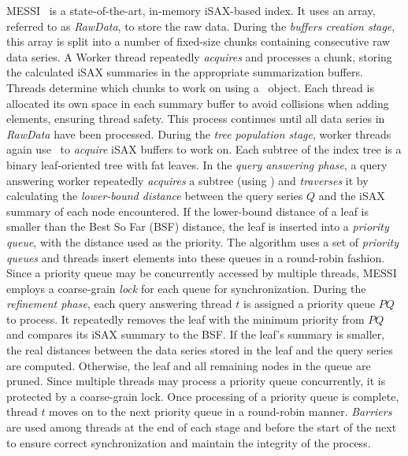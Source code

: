 MESSI~\cite{peng2020messi} is a state-of-the-art, in-memory iSAX-based index.
It uses an array, referred to as \textit{RawData}, to store the raw data. During the 
{\em buffers creation stage}, this array is split into a number of fixed-size chunks 
containing consecutive raw data series. A Worker thread repeatedly {\em acquires} and
processes a chunk, storing the calculated iSAX summaries in the appropriate 
summarization buffers. Threads determine which chunks to work on using a \FAI\ object.
Each thread is allocated its own space in each summary buffer to avoid collisions when
adding elements, ensuring thread safety. This process continues until all data series in
\textit{RawData} have been processed.
% 
During the {\em tree population stage}, worker threads again use \FAI\ to {\em acquire}
iSAX buffers to work on. Each subtree of the index tree is a binary leaf-oriented tree
with fat leaves.
% 
In the {\em query answering phase}, a query answering worker repeatedly {\em acquires}
a subtree (using \FAI) and {\em traverses} it by calculating the {\em lower-bound
distance} between the query series \( Q \) and the iSAX summary of each node
encountered. If the lower-bound distance of a leaf is smaller than the Best So Far (BSF)
distance, the leaf is inserted into a {\em priority queue}, with the distance
used as the priority. The algorithm uses a set of {\em priority queues} and threads 
insert elements into these queues in a round-robin fashion.
Since a priority queue may be concurrently accessed by multiple threads, 
MESSI employs a coarse-grain {\em lock} for each queue for synchronization.
% 
During the {\em refinement phase}, each query answering thread \( t \) is assigned a 
priority queue \( \mathit{PQ} \) to process. It repeatedly removes the leaf with the
minimum priority from \( \mathit{PQ} \) and compares its iSAX summary to the BSF.
If the leaf's summary is smaller, the real distances between the data series stored
in the leaf and the query series are computed. Otherwise, the leaf and all remaining
nodes in the queue are pruned. Since multiple threads may process a priority queue
concurrently, it is protected by a coarse-grain lock. Once processing of a priority
queue is complete, thread \( t \) moves on to the next priority queue in a round-robin
manner.
% 
{\em Barriers} are used among threads at the end of each stage and before the start of 
the next to ensure correct synchronization and maintain the integrity of the process.

